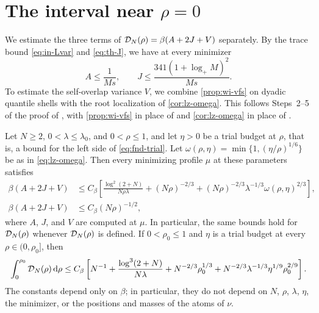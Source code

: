 \section{The interval near \texorpdfstring{$\rho=0$}{rho = 0}}
\label{subsec:b7-small}

We estimate the three terms of $\mathcal D_N(\rho)=\beta(A+2J+V)$ separately.
By the trace bound \eqref{eq:in-Lvar} and
\eqref{eq:th-J}, we have at every minimizer
\begin{equation}\label{eq:sm-AJ}
 A\le\frac1{Ms},\qquad
 J\le\frac{341(1+\log_+M)^2}{Ms}.
\end{equation}
To estimate the self-overlap variance $V$, we combine
\cref{prop:wi-vfs} on dyadic quantile shells with the root localization
of \cref{cor:lz-omega}. This follows Steps~2--5 of the proof of
\cite[Proposition~7.7]{AL}, with \cref{prop:wi-vfs} in place of
\cite[Lemma~3.3]{AL} and \cref{cor:lz-omega} in place of
\cite[Lemma~7.6]{AL}.

\begin{proposition}[The interval near $\rho=0$]\label{prop:sm-small}
Let $N\ge2$, $0<\lambda\le\lambda_0$, and $0<\rho\le1$, and let $\eta>0$
be a trial budget at $\rho$, that is, a bound for the left side of
\eqref{eq:fnd-trial}. Let
$\omega(\rho,\eta)=\min\{1,(\eta/\rho)^{1/6}\}$ be as in
\eqref{eq:lz-omega}. Then every minimizing profile $\mu$ at these
parameters satisfies
\begin{align}
 \beta(A+2J+V)
 &\le C_\beta\left[
 \frac{\log^2(2+N)}{N\rho\lambda}
 +(N\rho)^{-2/3}
 +(N\rho)^{-2/3}\lambda^{-1/3}\omega(\rho,\eta)^{2/3}
 \right],\label{eq:sm-pointwise}\\
 \beta(A+2J+V)&\le C_\beta(N\rho)^{-1/2},
 \label{eq:sm-moving}
\end{align}
where $A$, $J$, and $V$ are computed at $\mu$. In particular, the same
bounds hold for $\mathcal D_N(\rho)$ whenever $\mathcal D_N(\rho)$ is defined. If
$0<\rho_0\le1$ and $\eta$ is a trial budget at every $\rho\in(0,\rho_0]$,
then
\begin{equation}\label{eq:sm-integrated}
 \int_0^{\rho_0}\mathcal D_N(\rho)\,\mathrm d\rho
 \le C_\beta\left[
 N^{-1}+\frac{\log^3(2+N)}{N\lambda}
 +N^{-2/3}\rho_0^{1/3}
 +N^{-2/3}\lambda^{-1/3}\eta^{1/9}\rho_0^{2/9}
 \right].
\end{equation}
The constants depend only on $\beta$; in particular, they do not depend
on $N$, $\rho$, $\lambda$, $\eta$, the minimizer, or the positions and
masses of the atoms of $\nu$.
\end{proposition}

